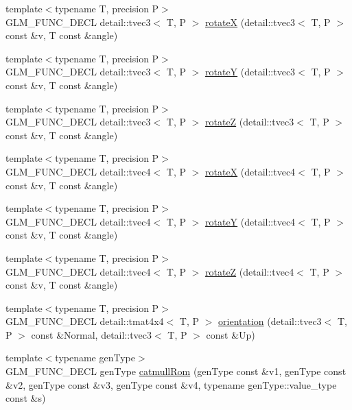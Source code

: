 \begin{CompactItemize}
\item 
{\footnotesize template$<$typename T, precision P$>$ }\\GLM\_\-FUNC\_\-DECL detail::tvec3$<$ T, P $>$ \hyperlink{group__gtx__rotate__vector_g29ccc284b661dc52c457959f8cbf8af6}{rotateX} (detail::tvec3$<$ T, P $>$ const \&v, T const \&angle)
\item 
{\footnotesize template$<$typename T, precision P$>$ }\\GLM\_\-FUNC\_\-DECL detail::tvec3$<$ T, P $>$ \hyperlink{group__gtx__rotate__vector_g8e792cb7fbd2ad57a4eafcccc62c523c}{rotateY} (detail::tvec3$<$ T, P $>$ const \&v, T const \&angle)
\item 
{\footnotesize template$<$typename T, precision P$>$ }\\GLM\_\-FUNC\_\-DECL detail::tvec3$<$ T, P $>$ \hyperlink{group__gtx__rotate__vector_g67b56c3da73e7da777810b2a82bab4f8}{rotateZ} (detail::tvec3$<$ T, P $>$ const \&v, T const \&angle)
\item 
{\footnotesize template$<$typename T, precision P$>$ }\\GLM\_\-FUNC\_\-DECL detail::tvec4$<$ T, P $>$ \hyperlink{group__gtx__rotate__vector_g846674e399c4106196405900ce78fe27}{rotateX} (detail::tvec4$<$ T, P $>$ const \&v, T const \&angle)
\item 
{\footnotesize template$<$typename T, precision P$>$ }\\GLM\_\-FUNC\_\-DECL detail::tvec4$<$ T, P $>$ \hyperlink{group__gtx__rotate__vector_g8e90d477a21ac9e17a8b764eac6d0999}{rotateY} (detail::tvec4$<$ T, P $>$ const \&v, T const \&angle)
\item 
{\footnotesize template$<$typename T, precision P$>$ }\\GLM\_\-FUNC\_\-DECL detail::tvec4$<$ T, P $>$ \hyperlink{group__gtx__rotate__vector_g4505b3c64cf26afba934ad1f65c5f792}{rotateZ} (detail::tvec4$<$ T, P $>$ const \&v, T const \&angle)
\item 
{\footnotesize template$<$typename T, precision P$>$ }\\GLM\_\-FUNC\_\-DECL detail::tmat4x4$<$ T, P $>$ \hyperlink{group__gtx__rotate__vector_g6388a91274507ab81224d8f5d434875e}{orientation} (detail::tvec3$<$ T, P $>$ const \&Normal, detail::tvec3$<$ T, P $>$ const \&Up)
\item 
{\footnotesize template$<$typename genType$>$ }\\GLM\_\-FUNC\_\-DECL genType \hyperlink{group__gtx__spline_gb08e3c8b7ddaa352cd1415f654f4d628}{catmullRom} (genType const \&v1, genType const \&v2, genType const \&v3, genType const \&v4, typename genType::value\_\-type const \&s)

\end{CompactItemize}
